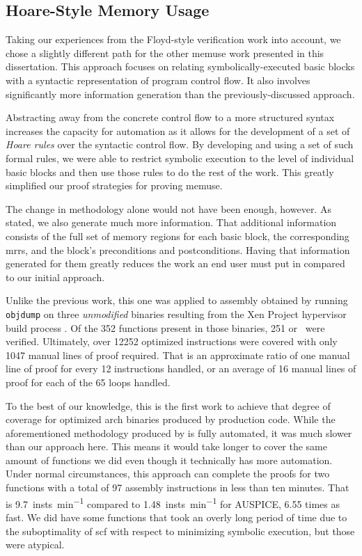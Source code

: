 \subsection{Hoare-Style Memory Usage}
Taking our experiences from the Floyd-style verification work into account, we chose a slightly different path for the other \gls{memuse} work presented in this dissertation.
This approach focuses on relating symbolically-executed basic blocks with a syntactic representation of program control flow.
It also involves significantly more information generation than the previously-discussed approach.

Abstracting away from the concrete control flow to a more structured syntax increases the capacity for automation as it allows for the development of a set of \emph{Hoare rules} \autocite{hoare1969axiomatic} over the syntactic control flow.
By developing and using a set of such formal rules, we were able to restrict symbolic execution to the level of individual basic blocks and then use those rules to do the rest of the work.
This greatly simplified our proof strategies for proving \gls{memuse}.

The change in methodology alone would not have been enough, however.
As stated, we also generate much more information.
That additional information consists of the full set of memory regions for each basic block, the corresponding \acp{mrr}, and the block's preconditions and postconditions.
Having that information generated for them greatly reduces the work an end user must put in compared to our initial approach.

Unlike the previous work, this one was applied to assembly obtained by running \texttt{objdump} on three \emph{unmodified} binaries resulting from the Xen Project hypervisor build process \autocite{chisnall2008definitive}.
Of the \num{352} functions present in those binaries, \num{251} or \xenpercentage\ were verified.
Ultimately, over \num{12252} optimized instructions were covered with only \num{1047} manual lines of proof required.
That is an approximate ratio of one manual line of proof for every \num{12} instructions handled, or an average of \num{16} manual lines of proof for each of the \num{65} loops handled.

To the best of our knowledge, this is the first work to achieve that degree of coverage for optimized \gls{arch} binaries produced by production code.
While the aforementioned methodology produced by \textcite{tan2015auspice} is fully automated, it was much slower than our approach here.
This means it would take longer to cover the same amount of functions we did even though it technically has more automation.
Under normal circumstances, this approach can complete the proofs for two functions with a total of \num{97} assembly instructions in less than ten minutes.
That is \SI{9.7}{insts\per\minute} compared to \SI{1.48}{insts\per\minute} for AUSPICE, \num{6.55} times as fast.
We did have some functions that took an overly long period of time due to the suboptimality of \acl*{scf} with respect to minimizing symbolic execution, but those were atypical.

